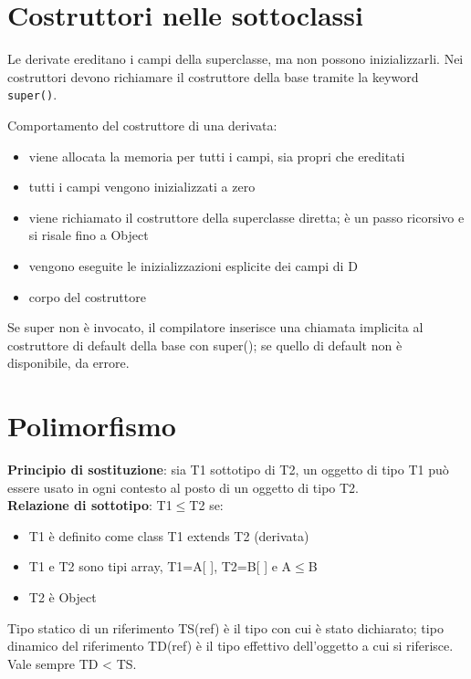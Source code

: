 \section{Costruttori nelle sottoclassi} %
Le derivate ereditano i campi della superclasse, ma non possono inizializzarli. Nei costruttori devono richiamare il costruttore della base tramite la keyword \texttt{super()}.

Comportamento del costruttore di una derivata:
\begin{itemize}
\item viene allocata la memoria per tutti i campi, sia propri che ereditati
\item tutti i campi vengono inizializzati a zero
\item viene richiamato il costruttore della superclasse diretta; è un passo ricorsivo e si risale fino a Object
\item vengono eseguite le inizializzazioni esplicite dei campi di D
\item corpo del costruttore
\end{itemize}
Se super non è invocato, il compilatore inserisce una chiamata implicita al costruttore di default della base con super(); se quello di default non è disponibile, da errore.


\section{Polimorfismo}

\textbf{Principio di sostituzione}: sia T1 sottotipo di T2, un oggetto di tipo T1 può essere usato in ogni contesto al posto di un oggetto di tipo T2. \\
\textbf{Relazione di sottotipo}: T1$\le$T2 se:
\begin{itemize}
\item T1 è definito come class T1 extends T2 (derivata)
\item T1 e T2 sono tipi array, T1=A[ ], T2=B[ ] e A$\le$B
\item T2 è Object
\end{itemize}

Tipo statico di un riferimento TS(ref) è il tipo con cui è stato dichiarato; tipo dinamico del riferimento TD(ref) è il tipo effettivo dell'oggetto a cui si riferisce. Vale sempre TD < TS.

